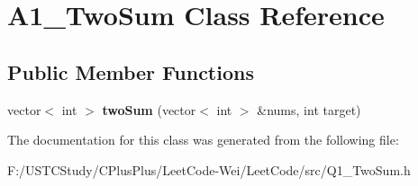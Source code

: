 \hypertarget{class_a1___two_sum}{}\section{A1\+\_\+\+Two\+Sum Class Reference}
\label{class_a1___two_sum}
\subsection*{Public Member Functions}
\begin{DoxyCompactItemize}
\item 
\hypertarget{class_a1___two_sum_a0880ed347006e7309ae96ef961e2ca2d}{}\label{class_a1___two_sum_a0880ed347006e7309ae96ef961e2ca2d} 
vector$<$ int $>$ {\bfseries two\+Sum} (vector$<$ int $>$ \&nums, int target)
\end{DoxyCompactItemize}


The documentation for this class was generated from the following file\+:\begin{DoxyCompactItemize}
\item 
F\+:/\+U\+S\+T\+C\+Study/\+C\+Plus\+Plus/\+Leet\+Code-\/\+Wei/\+Leet\+Code/src/Q1\+\_\+\+Two\+Sum.\+h\end{DoxyCompactItemize}
